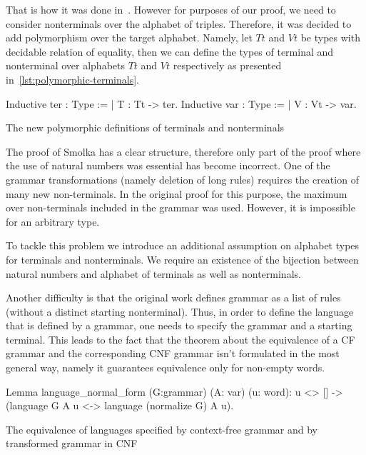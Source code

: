 That is how it was done in~\cite{smolkaHofmann2016}. However for purposes of our proof, we need to consider nonterminals over the alphabet of triples. Therefore, it was decided to add polymorphism over the target alphabet. Namely, let $Tt$ and $Vt$ be types with decidable relation of equality, then we can define the types of terminal and nonterminal over alphabets $Tt$ and $Vt$ respectively as presented in~\ref{lst:polymorphic-terminals}.

\begin{listing}[h]
    \begin{pyglist}[language=coq, numbers=none, numbersep=5pt]
  Inductive ter : Type := | T : Tt -> ter.
  Inductive var : Type := | V : Vt -> var.
    \end{pyglist}
    \caption{The new polymorphic definitions of terminals and nonterminals}
    \label{lst:polymorphic-terminals}
\end{listing}

The proof of Smolka has a clear structure, therefore only part of the proof where the use of natural numbers was essential has become incorrect. One of the grammar transformations (namely deletion of long rules) requires the creation of many new non-terminals. In the original proof for this purpose, the maximum over non-terminals included in the grammar was used. However, it is impossible for an arbitrary type.

To tackle this problem we introduce an additional assumption on alphabet types for terminals and nonterminals. We require an existence of the bijection between natural numbers and alphabet of terminals as well as nonterminals.

Another difficulty is that the original work defines grammar as a list of rules (without a distinct starting nonterminal). Thus, in order to define the language that is defined by a  grammar, one needs to specify the grammar and a starting terminal. This leads to the fact that the theorem about the equivalence of a CF grammar and the corresponding CNF grammar isn't formulated in the most general way, namely it guarantees equivalence only for non-empty words. 

\begin{listing}[h]
    \begin{pyglist}[language=coq, numbers=none, numbersep=5pt]
  Lemma language_normal_form 
      (G:grammar) (A: var) (u: word):
    u <> [] -> 
    (language G A u <-> 
       language (normalize G) A u).
    \end{pyglist}
    \caption{The equivalence of languages specified by context-free grammar and by transformed grammar in CNF}
    \label{lst:verbments1}
\end{listing}

